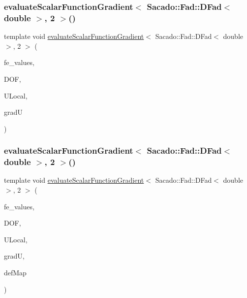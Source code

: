 \subsubsection{\texorpdfstring{evaluateScalarFunctionGradient$<$ Sacado::Fad::DFad$<$ double $>$, 2 $>$()}{evaluateScalarFunctionGradient< Sacado::Fad::DFad< double >, 2 >()}\hspace{0.1cm}{\footnotesize\ttfamily [1/4]}}
{\footnotesize\ttfamily template void \mbox{\hyperlink{group___evaluation_functions_gabedd4ae2841d2332ed0df0513b189e34}{evaluate\+Scalar\+Function\+Gradient}}$<$ Sacado\+::\+Fad\+::\+D\+Fad$<$ double $>$, 2 $>$ (\begin{DoxyParamCaption}\item[{const F\+E\+Values$<$ 2 $>$ \&}]{fe\+\_\+values,  }\item[{unsigned int}]{D\+OF,  }\item[{Table$<$ 1, Sacado\+::\+Fad\+::\+D\+Fad$<$ double $>$$>$ \&}]{U\+Local,  }\item[{Table$<$ 2, Sacado\+::\+Fad\+::\+D\+Fad$<$ double $>$$>$ \&}]{gradU }\end{DoxyParamCaption})}

\mbox{\label{function_evaluations_8cc_a9314f95484440c9c86bff06911c6d52e}} 
\subsubsection{\texorpdfstring{evaluateScalarFunctionGradient$<$ Sacado::Fad::DFad$<$ double $>$, 2 $>$()}{evaluateScalarFunctionGradient< Sacado::Fad::DFad< double >, 2 >()}\hspace{0.1cm}{\footnotesize\ttfamily [2/4]}}
{\footnotesize\ttfamily template void \mbox{\hyperlink{group___evaluation_functions_gabedd4ae2841d2332ed0df0513b189e34}{evaluate\+Scalar\+Function\+Gradient}}$<$ Sacado\+::\+Fad\+::\+D\+Fad$<$ double $>$, 2 $>$ (\begin{DoxyParamCaption}\item[{const F\+E\+Values$<$ 2 $>$ \&}]{fe\+\_\+values,  }\item[{unsigned int}]{D\+OF,  }\item[{Table$<$ 1, Sacado\+::\+Fad\+::\+D\+Fad$<$ double $>$$>$ \&}]{U\+Local,  }\item[{Table$<$ 2, Sacado\+::\+Fad\+::\+D\+Fad$<$ double $>$$>$ \&}]{gradU,  }\item[{\mbox{\hyperlink{structdeformation_map}{deformation\+Map}}$<$ Sacado\+::\+Fad\+::\+D\+Fad$<$ double $>$, 2 $>$ \&}]{def\+Map }\end{DoxyParamCaption})}

